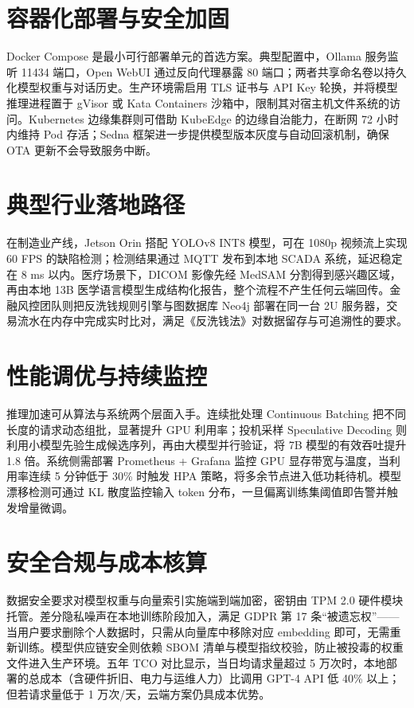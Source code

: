 \chapter{容器化部署与安全加固}
Docker Compose 是最小可行部署单元的首选方案。典型配置中，Ollama 服务监听 11434 端口，Open WebUI 通过反向代理暴露 80 端口；两者共享命名卷以持久化模型权重与对话历史。生产环境需启用 TLS 证书与 API Key 轮换，并将模型推理进程置于 gVisor 或 Kata Containers 沙箱中，限制其对宿主机文件系统的访问。Kubernetes 边缘集群则可借助 KubeEdge 的边缘自治能力，在断网 72 小时内维持 Pod 存活；Sedna 框架进一步提供模型版本灰度与自动回滚机制，确保 OTA 更新不会导致服务中断。\par
\chapter{典型行业落地路径}
在制造业产线，Jetson Orin 搭配 YOLOv8 INT8 模型，可在 1080p 视频流上实现 60 FPS 的缺陷检测；检测结果通过 MQTT 发布到本地 SCADA 系统，延迟稳定在 8 ms 以内。医疗场景下，DICOM 影像先经 MedSAM 分割得到感兴趣区域，再由本地 13B 医学语言模型生成结构化报告，整个流程不产生任何云端回传。金融风控团队则把反洗钱规则引擎与图数据库 Neo4j 部署在同一台 2U 服务器，交易流水在内存中完成实时比对，满足《反洗钱法》对数据留存与可追溯性的要求。\par
\chapter{性能调优与持续监控}
推理加速可从算法与系统两个层面入手。连续批处理 Continuous Batching 把不同长度的请求动态组批，显著提升 GPU 利用率；投机采样 Speculative Decoding 则利用小模型先验生成候选序列，再由大模型并行验证，将 7B 模型的有效吞吐提升 1.8 倍。系统侧需部署 Prometheus + Grafana 监控 GPU 显存带宽与温度，当利用率连续 5 分钟低于 30\%{} 时触发 HPA 策略，将多余节点进入低功耗待机。模型漂移检测可通过 KL 散度监控输入 token 分布，一旦偏离训练集阈值即告警并触发增量微调。\par
\chapter{安全合规与成本核算}
数据安全要求对模型权重与向量索引实施端到端加密，密钥由 TPM 2.0 硬件模块托管。差分隐私噪声在本地训练阶段加入，满足 GDPR 第 17 条“被遗忘权”——当用户要求删除个人数据时，只需从向量库中移除对应 embedding 即可，无需重新训练。模型供应链安全则依赖 SBOM 清单与模型指纹校验，防止被投毒的权重文件进入生产环境。五年 TCO 对比显示，当日均请求量超过 5 万次时，本地部署的总成本（含硬件折旧、电力与运维人力）比调用 GPT-4 API 低 40\%{} 以上；但若请求量低于 1 万次/天，云端方案仍具成本优势。\par
